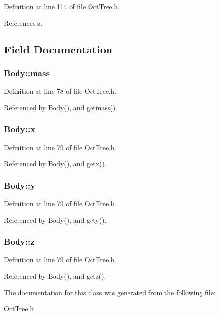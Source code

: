 Definition at line 114 of file OctTree.h.



References z.



\subsection{Field Documentation}
\subsubsection[{mass}]{ {\bf Body::mass}}\label{classBody_ae90051f181de1be6b376d2583907acd8}


Definition at line 78 of file OctTree.h.



Referenced by Body(), and getmass().

\subsubsection[{x}]{ {\bf Body::x}}\label{classBody_aea6e1aa5de0e3511484847e1babef086}


Definition at line 79 of file OctTree.h.



Referenced by Body(), and getx().

\subsubsection[{y}]{ {\bf Body::y}}\label{classBody_a9165fbd0f5998a1c8b2d8fe9dd50af6f}


Definition at line 79 of file OctTree.h.



Referenced by Body(), and gety().

\subsubsection[{z}]{ {\bf Body::z}}\label{classBody_ae125fbcda6663e5853ec480ae8eb348f}


Definition at line 79 of file OctTree.h.



Referenced by Body(), and getz().



The documentation for this class was generated from the following file:\begin{DoxyCompactItemize}
\item 
\hyperlink{OctTree_8h}{OctTree.h}\end{DoxyCompactItemize}
